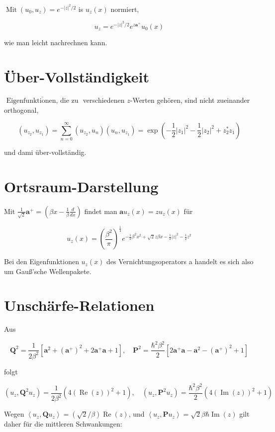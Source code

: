 \documentclass[10pt, letterpaper]{article}
\begin{document}
$\operatorname{Mit}\left(u_{0}, u_{z}\right)=e^{-|z|^{2} / 2}$ is $u_{z}(x)$ normiert,

$$
u_{z}=e^{-|z|^{2} / 2} e^{z \mathbf{a}^{+}} u_{0}(x)
$$

wie man leicht nachrechnen kann.

\section*{Über-Vollständigkeit}
$\overline{\text { Eigenfunktionen, die zu }}$ verschiedenen $z$-Werten gehören, sind nicht zueinander orthogonal,

$$
\left(u_{z_{2}}, u_{z_{1}}\right)=\sum_{n=0}^{\infty}\left(u_{z_{2}}, u_{n}\right)\left(u_{n}, u_{z_{1}}\right)=\exp \left(-\frac{1}{2}\left|z_{1}\right|^{2}-\frac{1}{2}\left|z_{2}\right|^{2}+z_{2}^{*} z_{1}\right)
$$

und dami über-vollständig.

\section*{Ortsraum-Darstellung}
Mit $\frac{1}{\sqrt{2}} \mathbf{a}^{+}=\left(\beta x-\frac{1}{\beta} \frac{d}{d x}\right)$ findet man $\mathbf{a} u_{z}(x)=z u_{z}(x)$ für

$$
u_{z}(x)=\left(\frac{\beta^{2}}{\pi}\right)^{\frac{1}{4}} e^{-\frac{1}{2} \beta^{2} x^{2}+\sqrt{2} z \beta x-\frac{1}{2}|z|^{2}-\frac{1}{2} z^{2}}
$$

Bei den Eigenfunktionen $u_{z}(x)$ des Vernichtungsoperators a handelt es sich also um Gauß'sche Wellenpakete.

\section*{Unschärfe-Relationen}
Aus

$$
\mathbf{Q}^{2}=\frac{1}{2 \beta^{2}}\left[\mathbf{a}^{2}+\left(\mathbf{a}^{+}\right)^{2}+2 \mathbf{a}^{+} \mathbf{a}+1\right], \quad \mathbf{P}^{2}=\frac{\hbar^{2} \beta^{2}}{2}\left[2 \mathbf{a}^{+} \mathbf{a}-\mathbf{a}^{2}-\left(\mathbf{a}^{+}\right)^{2}+1\right]
$$

folgt

$$
\left(u_{z}, \mathbf{Q}^{2} u_{z}\right)=\frac{1}{2 \beta^{2}}\left(4(\operatorname{Re}(z))^{2}+1\right), \quad\left(u_{z}, \mathbf{P}^{2} u_{z}\right)=\frac{\hbar^{2} \beta^{2}}{2}\left(4(\operatorname{Im}(z))^{2}+1\right)
$$

Wegen $\left\langle u_{z}, \mathbf{Q} u_{z}\right\rangle=(\sqrt{2} / \beta) \operatorname{Re}(z)$, und $\left\langle u_{z}, \mathbf{P} u_{z}\right\rangle=\sqrt{2} \beta \hbar \operatorname{Im}(z)$ gilt daher für die mittleren Schwankungen:
\end{document}
